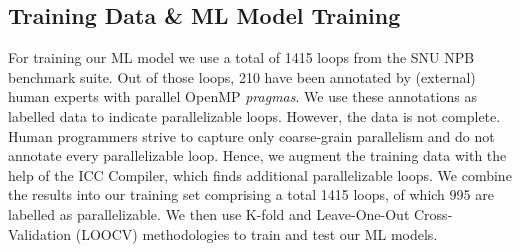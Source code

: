 \subsection{Training Data \& ML Model Training}
\label{loop_classification_labels}


For training our ML model we use a total of 1415 loops from the SNU NPB benchmark suite. Out of those loops, 210 have been annotated by (external) human experts with parallel OpenMP \textit{pragmas}. We use these annotations as labelled data to indicate parallelizable loops. However, the data is not complete. Human programmers strive to capture only coarse-grain parallelism and do not annotate every parallelizable loop. Hence, we augment the training data with the help of the ICC Compiler, which finds additional parallelizable loops. We combine the results into our training set comprising a total 1415 loops, of which 995 are labelled as parallelizable.  We then use K-fold and Leave-One-Out Cross-Validation (LOOCV) methodologies to train and test our ML models.


